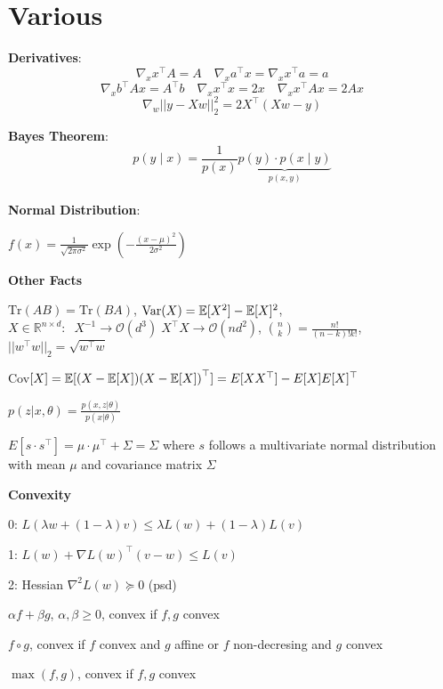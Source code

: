 \section*{Various}

\textbf{Derivatives}:
$$\nabla_x x^\top A = A \quad \nabla_x a^\top x = \nabla_x x^\top a = a$$
$$\nabla_x b^\top A x = A^\top b \quad \nabla_x x^\top x = 2x \quad \nabla_x x^\top A x = 2 Ax$$
$$\nabla_w || y-Xw||_2^2 = 2X^\top(Xw-y)$$

\textbf{Bayes Theorem}: \\[-13pt]
$$p(y \; | \; x) = \frac{1}{p(x)} \underbrace{p(y) \cdot p(x \; | \; y)}_{p(x,y)}$$ \\[-23pt]

\textbf{Normal Distribution}:

$f(x) = \frac{1}{\sqrt{2\pi \sigma^2}} \exp\left(-\frac{(x - \mu)^2}{2\sigma^2}\right)$

\textbf{Other Facts}

$\text{Tr}(AB) = \text{Tr}(BA)$, $\text{Var}(X) = \mathbb{E}[X^2] - \mathbb{E}[X]^2$, $X \in \mathbb{R}^{n \times d}: \; \; X^{-1} \rightarrow \mathcal{O}(d^3) \; X^\top X \rightarrow \mathcal{O}(nd^2)$, $\binom{n}{k} = \frac{n!}{(n-k)!k!}$, $||w^\top w||_2 = \sqrt{w^\top w}$
 
Cov$[X] = \mathbb{E}[(X- \mathbb{E}[X]){(X- \mathbb{E}[X])}^\top] = E[XX^{\top}] - E[X]E[X]^{\top}$

$p(z|x,\theta) = \frac{p(x,z|\theta)}{p(x | \theta)}$

$E[s \cdot {s}^\top] = \mu \cdot \mu^\top + \Sigma = \Sigma$ where $s$ follows a multivariate normal distribution with mean $\mu$ and covariance matrix $\Sigma$

\textbf{Convexity}

0: $L(\lambda w + (1 - \lambda)v) \leq \lambda L (w) + (1- \lambda) L(v)$

1: $L(w) + \nabla L(w)^\top (v - w) \leq L(v)$

2: Hessian $\nabla^2 L (w) \succcurlyeq 0$ (psd)

\begin{compactitem}
	\item $\alpha f + \beta g$, $\alpha, \beta \geq 0$, convex if $f, g$ convex
	\item $f \circ g$, convex if $f$ convex and $g$ affine or $f$ non-decresing and $g$ convex
	\item $\max(f, g)$, convex if $f,g$ convex
\end{compactitem}
